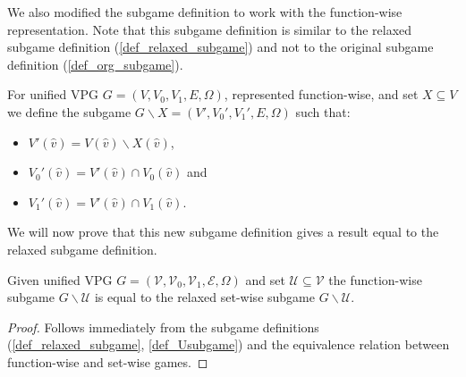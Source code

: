 We also modified the subgame definition to work with the function-wise representation. Note that this subgame definition is similar to the relaxed subgame definition (\ref{def_relaxed_subgame}) and not to the original subgame definition (\ref{def_org_subgame}).
\begin{definition}
	\label{def_Usubgame}
	For unified VPG $G = (V,V_0,V_1,E,\Omega)$, represented function-wise, and set $X \subseteq V$ we define the subgame $G \backslash X = (V',V_0',V_1',E,\Omega)$ such that:
	\begin{itemize}
		\item $V'(\hat{v}) = V(\hat{v}) \backslash X(\hat{v})$,
		\item $V_0'(\hat{v}) = V'(\hat{v}) \cap V_0(\hat{v})$ and
		\item $V_1'(\hat{v}) = V'(\hat{v}) \cap V_1(\hat{v})$.
	\end{itemize}
\end{definition}
We will now prove that this new subgame definition gives a result equal to the relaxed subgame definition.
\begin{lemma}
	\label{lem_subgame_eq}
	Given unified VPG $G = (\mathcal{V},\mathcal{V}_0,\mathcal{V}_1, \mathcal{E}, \Omega)$ and set $\mathcal{U} \subseteq \mathcal{V}$ the function-wise subgame $G \backslash \mathcal{U}$ is equal to the relaxed set-wise subgame $G \backslash \mathcal{U}$.
	\begin{proof}
		Follows immediately from the subgame definitions (\ref{def_relaxed_subgame}, \ref{def_Usubgame}) and the equivalence relation between function-wise and set-wise games.
	\end{proof}
\end{lemma}

